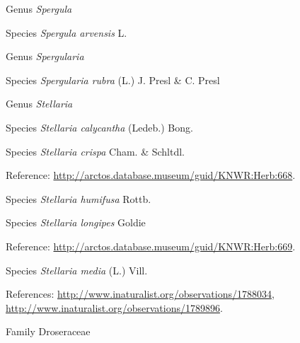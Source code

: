 \documentclass[9pt, article]{memoir}
\begin{document}
\begin{multicols}{2}
\vspace{6pt}\noindent\hspace{30pt}Genus \textit{Spergula}


\vspace{6pt}\noindent\hspace{36pt}Species \textit{Spergula arvensis} L.


\vspace{6pt}\noindent\hspace{30pt}Genus \textit{Spergularia}


\vspace{6pt}\noindent\hspace{36pt}Species \textit{Spergularia rubra} (L.) J. Presl \& C. Presl


\vspace{6pt}\noindent\hspace{30pt}Genus \textit{Stellaria}


\vspace{6pt}\noindent\hspace{36pt}Species \textit{Stellaria calycantha} (Ledeb.) Bong.


\vspace{6pt}\noindent\hspace{36pt}Species \textit{Stellaria crispa} Cham. \& Schltdl.


\vspace{6pt}Reference: 
\url{http://arctos.database.museum/guid/KNWR:Herb:668}.

\vspace{6pt}\noindent\hspace{36pt}Species \textit{Stellaria humifusa} Rottb.


\vspace{6pt}\noindent\hspace{36pt}Species \textit{Stellaria longipes} Goldie


\vspace{6pt}Reference: 
\url{http://arctos.database.museum/guid/KNWR:Herb:669}.

\vspace{6pt}\noindent\hspace{36pt}Species \textit{Stellaria media} (L.) Vill.


\vspace{6pt}References: 
\url{http://www.inaturalist.org/observations/1788034}, 
\url{http://www.inaturalist.org/observations/1789896}.

\vspace{6pt}\noindent\hspace{24pt}Family Droseraceae



\end{multicols}
\end{document}
